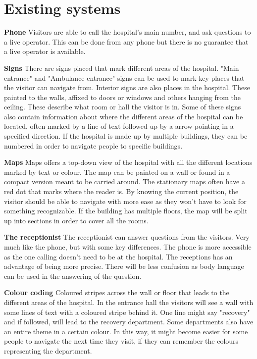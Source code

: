 \section{Existing systems} %
\label{sec:existing_systems}



\textbf{Phone}
Visitors are able to call the hospital's main number, and ask questions to a live operator. This can be done from any phone but there is no guarantee that a live operator is available.

\textbf{Signs}
There are signs placed that mark different areas of the hospital. "Main entrance" and "Ambulance entrance" signs can be used to mark key places that the visitor can navigate from.
Interior signs are also places in the hospital. These painted to the walls, affixed to doors or windows and others hanging from the ceiling. These describe what room or hall the visitor is in. Some of these signs also contain information about where the different areas of the hospital can be located, often marked by a line of text followed up by a arrow pointing in a specified direction. If the hospital is made up by multiple buildings, they can be numbered in order to navigate people to specific buildings.

\textbf{Maps}
Maps offers a top-down view of the hospital with all the different locations marked by text or colour. The map can be painted on a wall or found in a compact version meant to be carried around. The stationary maps often have a red dot that marks where the reader is. By knowing the current position, the visitor should be able to navigate with more ease as they won't have to look for something recognizable. If the building has multiple floors, the map will be split up into sections in order to cover all the rooms.

\textbf{The receptionist}
The receptionist can answer questions from the visitors. Very much like the phone, but with some key differences. The phone is more accessible as the one calling doesn't need to be at the hospital. The receptions has an advantage of being more precise. There will be less confusion as body language can be used in the answering of the question.

\textbf{Colour coding}
Coloured stripes across the wall or floor that leads to the different areas of the hospital. In the entrance hall the visitors will see a wall with some lines of text with a coloured stripe behind it. One line might say "recovery" and if followed, will lead to the recovery department. Some departments also have an entire theme in a certain colour. In this way, it might become easier for some people to navigate the next time they visit, if they can remember the colours representing the department. 

